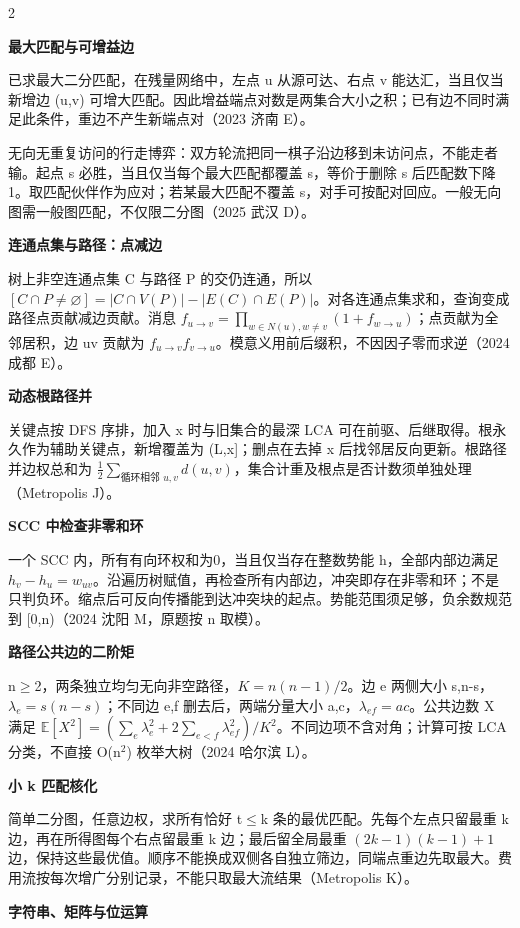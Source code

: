 \documentclass[UTF8,fontset=fandol,a4paper,twoside]{ctexart}
\newcommand{\topic}[1]{\par\smallskip\textbf{#1}\par\nobreak}
\newcommand{\note}[1]{{\fontsize{10}{12}\selectfont #1\par}}
\begin{document}
\begin{multicols}{2}
\par\textbf{最大匹配与可增益边}\quad
\note{已求最大二分匹配，在残量网络中，左点 u 从源可达、右点 v 能达汇，当且仅当新增边 (\allowbreak{}u,\allowbreak{}v)\allowbreak{} 可增大匹配。因此增益端点对数是两集合大小之积；已有边不同时满足此条件，重边不产生新端点对（2023 济南 E）。}
\note{无向无重复访问的行走博弈：双方轮流把同一棋子沿边移到未访问点，不能走者输。起点 s 必胜，当且仅当每个最大匹配都覆盖 s，等价于删除 s 后匹配数下降1。取匹配伙伴作为应对；若某最大匹配不覆盖 s，对手可按配对回应。一般无向图需一般图匹配，不仅限二分图（2025 武汉 D）。}
\par\textbf{连通点集与路径：点减边}\quad
\note{树上非空连通点集 C 与路径 P 的交仍连通，所以 $[C\cap P\ne\varnothing]=|C\cap V(P)|-|E(C)\cap E(P)|$。对各连通点集求和，查询变成路径点贡献减边贡献。消息 $f_{u\to v}=\prod_{w\in N(u),w\ne v}(1+f_{w\to u})$；点贡献为全邻居积，边 uv 贡献为 $f_{u\to v}f_{v\to u}$。模意义用前后缀积，不因因子零而求逆（2024 成都 E）。}
\par\textbf{动态根路径并}\quad
\note{关键点按 DFS 序排，加入 x 时与旧集合的最深 LCA 可在前驱、后继取得。根永久作为辅助关键点，新增覆盖为 (\allowbreak{}L,\allowbreak{}x]\allowbreak{}；删点在去掉 x 后找邻居反向更新。根路径并边权总和为 $\frac12\sum_{\text{循环相邻 }u,v}d(u,v)$，集合计重及根点是否计数须单独处理（Metropolis J）。}
\par\textbf{SCC 中检查非零和环}\quad
\note{一个 SCC 内，所有有向环权和为0，当且仅当存在整数势能 h，全部内部边满足 $h_v-h_u=w_{uv}$。沿遍历树赋值，再检查所有内部边，冲突即存在非零和环；不是只判负环。缩点后可反向传播能到达冲突块的起点。势能范围须足够，负余数规范到 [\allowbreak{}0,\allowbreak{}n)\allowbreak{}（2024 沈阳 M，原题按 n 取模）。}
\par\textbf{路径公共边的二阶矩}\quad
\note{n\ensuremath{\ge}2，两条独立均匀无向非空路径，$K=n(n-1)/2$。边 e 两侧大小 s,\allowbreak{}n-\allowbreak{}s，$\lambda_e=s(n-s)$；不同边 e,\allowbreak{}f 删去后，两端分量大小 a,\allowbreak{}c，$\lambda_{ef}=ac$。公共边数 X 满足 $\mathbb E[X^2]=(\sum_e\lambda_e^2+2\sum_{e<f}\lambda_{ef}^2)/K^2$。不同边项不含对角；计算可按 LCA 分类，不直接 O(\allowbreak{}n\ensuremath{^2})\allowbreak{} 枚举大树（2024 哈尔滨 L）。}
\par\textbf{小 k 匹配核化}\quad
\note{简单二分图，任意边权，求所有恰好 t\ensuremath{\le}k 条的最优匹配。先每个左点只留最重 k 边，再在所得图每个右点留最重 k 边；最后留全局最重 $(2k-1)(k-1)+1$ 边，保持这些最优值。顺序不能换成双侧各自独立筛边，同端点重边先取最大。费用流按每次增广分别记录，不能只取最大流结果（Metropolis K）。}
\topic{字符串、矩阵与位运算}

\end{multicols}
\end{document}
